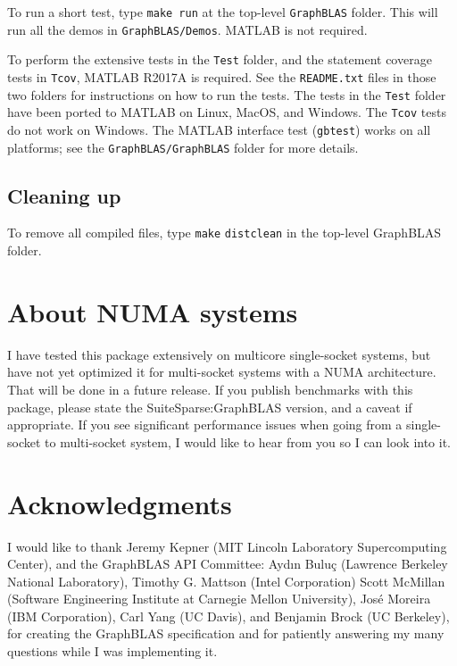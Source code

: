 \documentclass[12pt]{article}
\begin{document}
{To run a short test, type \verb'make run' at the top-level \verb'GraphBLAS'
folder.  This will run all the demos in \verb'GraphBLAS/Demos'.  MATLAB is not
required.

To perform the extensive tests in the \verb'Test' folder, and the statement
coverage tests in \verb'Tcov', MATLAB R2017A is required.  See the
\verb'README.txt' files in those two folders for instructions on how to run the
tests.  The tests in the \verb'Test' folder have been ported to MATLAB on
Linux, MacOS, and Windows.  The \verb'Tcov' tests do not work on Windows.  The
MATLAB interface test (\verb'gbtest') works on all platforms; see the
\verb'GraphBLAS/GraphBLAS' folder for more details.

\subsection{Cleaning up}

To remove all compiled files, type \verb'make' \verb'distclean' in the top-level
GraphBLAS folder.

\section{About NUMA systems}

I have tested this package extensively on multicore single-socket systems, but
have not yet optimized it for multi-socket systems with a NUMA architecture.
That will be done in a future release.  If you publish benchmarks
with this package, please state the SuiteSparse:GraphBLAS version, and a caveat
if appropriate.  If you see significant performance issues when going from a
single-socket to multi-socket system, I would like to hear from you so I can
look into it.

\section{Acknowledgments}

I would like to thank Jeremy Kepner (MIT Lincoln Laboratory Supercomputing
Center), and the GraphBLAS API Committee: Ayd\i n Bulu\c{c} (Lawrence Berkeley
National Laboratory), Timothy G. Mattson (Intel Corporation) Scott McMillan
(Software Engineering Institute at Carnegie Mellon University), Jos\'e Moreira
(IBM Corporation), Carl Yang (UC Davis), and Benjamin Brock (UC Berkeley), for
creating the GraphBLAS specification and for patiently answering my many
questions while I was implementing it.

}
\end{document}
